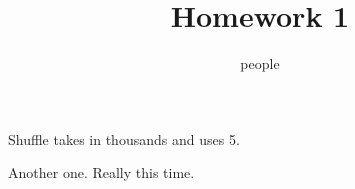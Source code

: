 \documentclass[handout]{ximera}
\title{Homework 1}
\author{people}
\begin{document}
\maketitle
\renewcommand{\latexProblemContent}[1]{#1}
Shuffle takes in thousands and uses 5.

\begin{shuffle}[5]
\end{shuffle}

%
%
%
%
%

Another one.  Really this time.
\end{document}
